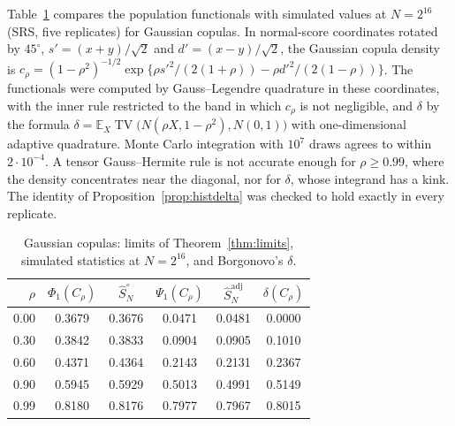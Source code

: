\documentclass[11pt,a4paper]{article}
\theoremstyle{definition}
\theoremstyle{remark}
\newcommand{\E}{\mathbb{E}}
\newcommand{\TV}{\operatorname{TV}}
\newcommand{\Sadj}{\hat S^{\mathrm{adj}}_N}
\newcommand{\Sun}{\hat S^{\circ}_N}
\begin{document}
Table~\ref{tab:gauss} compares the population functionals with simulated values at $N=2^{16}$ (SRS, five replicates) for Gaussian copulas. In normal-score coordinates rotated by $45^\circ$, $s'=(x+y)/\sqrt2$ and $d'=(x-y)/\sqrt2$, the Gaussian copula density is $c_\rho=(1-\rho^2)^{-1/2}\exp\{\rho s'^2/(2(1+\rho))-\rho d'^2/(2(1-\rho))\}$. The functionals were computed by Gauss--Legendre quadrature in these coordinates, with the inner rule restricted to the band in which $c_\rho$ is not negligible, and $\delta$ by the formula $\delta=\E_X\TV\big(N(\rho X,1-\rho^2),N(0,1)\big)$ with one-dimensional adaptive quadrature. Monte Carlo integration with $10^7$ draws agrees to within $2\cdot10^{-4}$. A tensor Gauss--Hermite rule is not accurate enough for $\rho\ge0.99$, where the density concentrates near the diagonal, nor for $\delta$, whose integrand has a kink. The identity of Proposition~\ref{prop:histdelta} was checked to hold exactly in every replicate.

\begin{table}[h]
\centering\small
\begin{tabular}{@{}rccccc@{}}
\toprule
$\rho$ & $\Phi_1(C_\rho)$ & $\Sun$ & $\Psi_1(C_\rho)$ & $\Sadj$ & $\delta(C_\rho)$\\
\midrule
0.00 & 0.3679 & 0.3676 & 0.0471 & 0.0481 & 0.0000\\
0.30 & 0.3842 & 0.3833 & 0.0904 & 0.0905 & 0.1010\\
0.60 & 0.4371 & 0.4364 & 0.2143 & 0.2131 & 0.2367\\
0.90 & 0.5945 & 0.5929 & 0.5013 & 0.4991 & 0.5149\\
0.99 & 0.8180 & 0.8176 & 0.7977 & 0.7967 & 0.8015\\
\bottomrule
\end{tabular}
\caption{Gaussian copulas: limits of Theorem~\ref{thm:limits}, simulated statistics at $N=2^{16}$, and Borgonovo's $\delta$.}
\label{tab:gauss}
\end{table}



\end{document}
